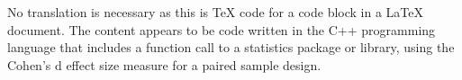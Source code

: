 No translation is necessary as this is TeX code for a code block in a LaTeX document. The content appears to be code written in the C++ programming language that includes a function call to a statistics package or library, using the Cohen's d effect size measure for a paired sample design.
